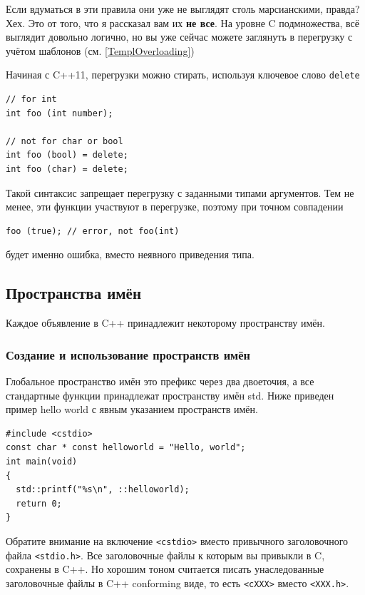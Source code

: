 \documentclass[a4paper,12pt,oneside]{article}
\begin{document}
Если вдуматься в эти правила они уже не выглядят столь марсианскими, правда? Хех. Это от того, что я рассказал вам их \textbf{не все}. На уровне C подмножества, всё выглядит довольно логично, но вы уже сейчас можете заглянуть в перегрузку с учётом шаблонов (см. \ref{TemplOverloading})

Начиная с C++11, перегрузки можно стирать, используя ключевое слово \lstinline!delete!

\begin{lstlisting}
// for int
int foo (int number);

// not for char or bool
int foo (bool) = delete;
int foo (char) = delete;
\end{lstlisting}

Такой синтаксис запрещает перегрузку с заданными типами аргументов. Тем не менее, эти функции участвуют в перегрузке, поэтому при точном совпадении

\begin{lstlisting}
foo (true); // error, not foo(int)
\end{lstlisting}

будет именно ошибка, вместо неявного приведения типа.

\pagebreak
\subsection{Пространства имён}\label{Namespaces}

Каждое объявление в C++ принадлежит некоторому пространству имён. 

\subsubsection{Создание и использование пространств имён}

Глобальное пространство имён это префикс через два двоеточия, а все стандартные функции принадлежат пространству имён std. Ниже приведен пример hello world с явным указанием пространств имён.

\begin{lstlisting}
#include <cstdio>
const char * const helloworld = "Hello, world";
int main(void)
{
  std::printf("%s\n", ::helloworld);
  return 0;
}
\end{lstlisting}

Обратите внимание на включение \lstinline!<cstdio>! вместо привычного заголовочного файла \lstinline!<stdio.h>!. Все заголовочные файлы к которым вы привыкли в C, сохранены в C++. Но хорошим тоном считается писать унаследованные заголовочные файлы в C++ conforming виде, то есть \lstinline!<cXXX>! вместо \lstinline!<XXX.h>!.
\end{document}
